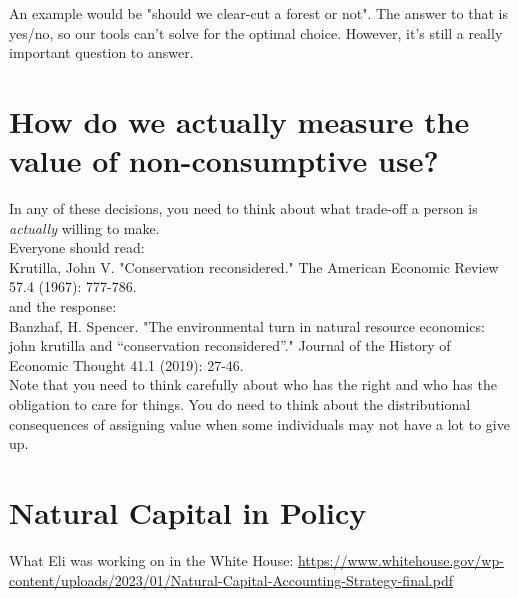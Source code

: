 \documentclass[12pt]{article}
\begin{document}
An example would be "should we clear-cut a forest or not". The answer to that is yes/no, so our tools can't solve for the optimal choice. However, it's still a really important question to answer. 

\section{How do we actually measure the value of non-consumptive use?}
In any of these decisions, you need to think about what trade-off a person is \textit{actually} willing to make. \\

Everyone should read:\\
Krutilla, John V. "Conservation reconsidered." The American Economic Review 57.4 (1967): 777-786.\\

and the response: \\
Banzhaf, H. Spencer. "The environmental turn in natural resource economics: john krutilla and “conservation reconsidered”." Journal of the History of Economic Thought 41.1 (2019): 27-46.\\

Note that you need to think carefully about who has the right and who has the obligation to care for things. You do need to think about the distributional consequences of assigning value when some individuals may not have a lot to give up.


\section{Natural Capital in Policy }
What Eli was working on in the White House: \url{https://www.whitehouse.gov/wp-content/uploads/2023/01/Natural-Capital-Accounting-Strategy-final.pdf}\\
\end{document}
